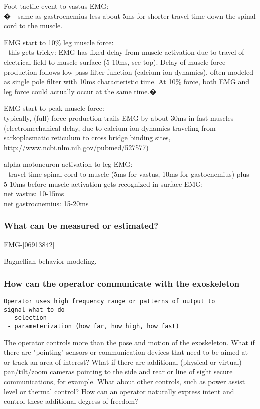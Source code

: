 \documentclass[letterpaper,12pt,fullpage]{article}
\begin{document}
Foot tactile event to vastus EMG:\\�
- same as gastrocnemius less about 5ms for shorter travel time down
the spinal cord to the muscle.

EMG start to 10\% leg muscle force:\\
- this gets tricky: EMG has fixed delay from muscle activation due to
travel of electrical field to muscle surface (5-10ms, see top). Delay
of muscle force production follows low pass filter function (calcium
ion dynamics), often modeled as single pole filter with 10ms
characteristic time. At 10\% force, both EMG and leg force could
actually occur at the same time.�

EMG start to peak muscle force:\\
typically, (full) force production trails EMG by about 30ms in fast
muscles (electromechanical delay, due to calcium ion dynamics
traveling from sarkoplasmatic reticulum to cross bridge binding
sites, \url{http://www.ncbi.nlm.nih.gov/pubmed/527577})

alpha motoneuron activation to leg EMG:\\
- travel time spinal cord to muscle (5ms for vastus, 10ms for
gastocnemius) plus 5-10ms before muscle activation gets recognized in
surface EMG:\\
net vastus: 10-15ms\\
net gastrocnemius: 15-20ms

\subsubsection{What can be measured or estimated?}

FMG-[06913842]

Bagnellian behavior modeling.

\subsubsection{How can the operator communicate with the exoskeleton}

\begin{verbatim}
Operator uses high frequency range or patterns of output to
signal what to do
 - selection
 - parameterization (how far, how high, how fast)
\end{verbatim}

The operator controls more than the pose and motion of the
exoskeleton. What if there are "pointing" sensors or communication
devices that need to be aimed at or track an area of interest? What if
there are additional (physical or virtual) pan/tilt/zoom cameras
pointing to the side and rear or line of sight secure communications,
for example. What about other controls, such as power assist level or
thermal control? How can an operator naturally express intent and
control these additional degress of freedom?
\end{document}
